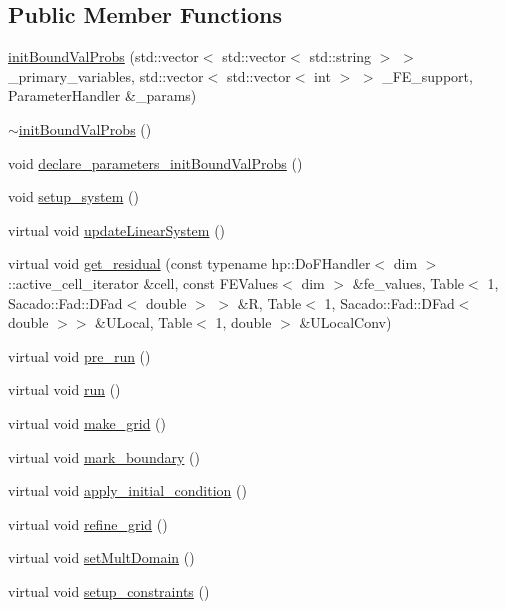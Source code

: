 \subsection*{Public Member Functions}
\begin{DoxyCompactItemize}
\item 
\hyperlink{classinit_bound_val_probs_af836a88e7f9df1d43d6f93c4747858fe}{init\-Bound\-Val\-Probs} (std\-::vector$<$ std\-::vector$<$ std\-::string $>$ $>$ \-\_\-primary\-\_\-variables, std\-::vector$<$ std\-::vector$<$ int $>$ $>$ \-\_\-\-F\-E\-\_\-support, Parameter\-Handler \&\-\_\-params)
\item 
\hyperlink{classinit_bound_val_probs_a38783cfbd559fbad9696ebd823769f53}{$\sim$init\-Bound\-Val\-Probs} ()
\item 
void \hyperlink{classinit_bound_val_probs_af60fa8844da68c0cd887b300855c086c}{declare\-\_\-parameters\-\_\-init\-Bound\-Val\-Probs} ()
\item 
void \hyperlink{classinit_bound_val_probs_a8f0c6272cf214048329d7cf1aa58b860}{setup\-\_\-system} ()
\item 
virtual void \hyperlink{classinit_bound_val_probs_af78c2c6284234c93872188334fb997d8}{update\-Linear\-System} ()
\item 
virtual void \hyperlink{classinit_bound_val_probs_ac8f2c3e2a1040c70b709900dc3dfdaea}{get\-\_\-residual} (const typename hp\-::\-Do\-F\-Handler$<$ dim $>$\-::active\-\_\-cell\-\_\-iterator \&cell, const F\-E\-Values$<$ dim $>$ \&fe\-\_\-values, Table$<$ 1, Sacado\-::\-Fad\-::\-D\-Fad$<$ double $>$ $>$ \&R, Table$<$ 1, Sacado\-::\-Fad\-::\-D\-Fad$<$ double $>$$>$ \&U\-Local, Table$<$ 1, double $>$ \&U\-Local\-Conv)
\item 
virtual void \hyperlink{classinit_bound_val_probs_a7a8df3f99e1d582c6c136b16d6e34d13}{pre\-\_\-run} ()
\item 
virtual void \hyperlink{classinit_bound_val_probs_a13a43e6d814de94978c515cb084873b1}{run} ()
\item 
virtual void \hyperlink{classinit_bound_val_probs_aadd4943e52767516f3f7c5460ea35032}{make\-\_\-grid} ()
\item 
virtual void \hyperlink{classinit_bound_val_probs_a7ed791f6f2c777286743182bf2f481bf}{mark\-\_\-boundary} ()
\item 
virtual void \hyperlink{classinit_bound_val_probs_a8d32e81a32f1aaf5682065458548e8e2}{apply\-\_\-initial\-\_\-condition} ()
\item 
virtual void \hyperlink{classinit_bound_val_probs_aea55077652a6fc58f1c0c250c4abd856}{refine\-\_\-grid} ()
\item 
virtual void \hyperlink{classinit_bound_val_probs_a5fb25d0981afa1f7d87875fffcc272c1}{set\-Mult\-Domain} ()
\item 
virtual void \hyperlink{classinit_bound_val_probs_a97967f7bc5aba9a2158464d2de9d2352}{setup\-\_\-constraints} ()
\end{DoxyCompactItemize}
